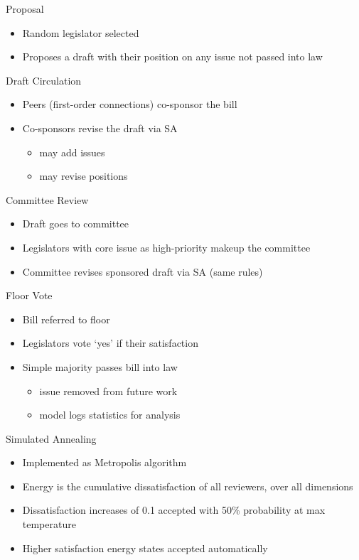 \documentclass[14pt]{beamer}
\begin{document}
\begin{frame}{Proposal} %
\begin{itemize}
\item Random legislator selected 
\item Proposes a draft with their position on any issue not passed into law
\end{itemize}
\end{frame}


\begin{frame}{Draft Circulation} %
\begin{itemize}
\item Peers (first-order connections) co-sponsor the bill
\item Co-sponsors revise the draft via SA
 \begin{itemize}
 \item may add issues
 \item may revise positions
 \end{itemize}   
\end{itemize}
\end{frame}


\begin{frame}{Committee Review} %
\begin{itemize}
\item Draft goes to committee
\item Legislators with core issue as high-priority makeup the committee
\item Committee revises sponsored draft via SA (same rules)
\end{itemize}
\end{frame}


\begin{frame}{Floor Vote} %
\begin{itemize}
\item Bill referred to floor
\item Legislators vote `yes' if their satisfaction  
\item Simple majority passes bill into law 
 \begin{itemize}
 \item issue removed from future work
 \item model logs statistics for analysis
 \end{itemize}
\end{itemize}
\end{frame}


\begin{frame}{Simulated Annealing} %
\begin{itemize}
\item Implemented as Metropolis algorithm
\item Energy is the cumulative dissatisfaction of all reviewers, over all dimensions
\item Dissatisfaction increases of 0.1 accepted with 50\% probability at max temperature
\item Higher satisfaction energy states accepted automatically
\end{itemize}
\end{frame}
\end{document}
